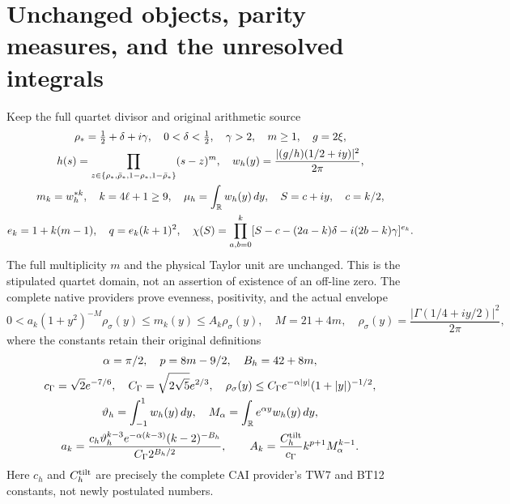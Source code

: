 \documentclass[11pt]{article}
\begin{document}
\section{Unchanged objects, parity measures, and the unresolved integrals}

Keep the full quartet divisor and original arithmetic source
\begin{equation}\label{mmnative:eq:native}
 \begin{gathered}
 \rho_*=\tfrac12+\delta+i\gamma,\quad0<\delta<\tfrac12,\quad\gamma>2,
 \quad m\ge1,\quad g=2\xi,\\
 h(s)=\prod_{z\in\{\rho_*,\bar\rho_*,1-\rho_*,1-\bar\rho_*\}}(s-z)^m,
 \quad w_h(y)=\frac{|(g/h)(1/2+iy)|^2}{2\pi},\\
 m_k=w_h^{*k},\quad k=4\ell+1\ge9,\quad
 \mu_h=\int_\mathbb R w_h(y)\,dy,\quad S=c+iy,\quad c=k/2,\\
 e_k=1+k(m-1),\quad q=e_k(k+1)^2,\quad
 \chi(S)=\prod_{a,b=0}^k
 [S-c-(2a-k)\delta-i(2b-k)\gamma]^{e_k}.
 \end{gathered}
\end{equation}
The full multiplicity $m$ and the physical Taylor unit are unchanged.
This is the stipulated quartet domain, not an assertion of existence of
an off-line zero.  The complete native providers \cite{mmnative:CAI,mmnative:HG} prove
evenness, positivity, and the actual envelope
\begin{equation}\label{mmnative:eq:envelope}
 0<a_k(1+y^2)^{-M}\rho_\sigma(y)\le m_k(y)\le A_k\rho_\sigma(y),
 \quad M=21+4m,\quad
 \rho_\sigma(y)=\frac{|\Gamma(1/4+iy/2)|^2}{2\pi},
\end{equation}
where the constants retain their original definitions
\begin{equation}\label{mmnative:eq:constants}
 \begin{gathered}
 \alpha=\pi/2,\quad p=8m-9/2,\quad B_h=42+8m,\\
 c_\Gamma=\sqrt2e^{-7/6},\quad
 C_\Gamma=\sqrt{2\sqrt5}e^{2/3},\quad
 \rho_\sigma(y)\le C_\Gamma e^{-\alpha|y|}(1+|y|)^{-1/2},\\
 \vartheta_h=\int_{-1}^1w_h(y)\,dy,\quad
 M_\alpha=\int_\mathbb R e^{\alpha y}w_h(y)\,dy,\\
 a_k=\frac{c_h\vartheta_h^{k-3}e^{-\alpha(k-3)}(k-2)^{-B_h}}
 {C_\Gamma2^{B_h/2}},\qquad
 A_k=\frac{C_h^{\rm tilt}}{c_\Gamma}k^{p+1}M_\alpha^{k-1}.
 \end{gathered}
\end{equation}
Here $c_h$ and $C_h^{\rm tilt}$ are precisely the complete CAI
provider's TW7 and BT12 constants, not newly postulated numbers.
\end{document}
